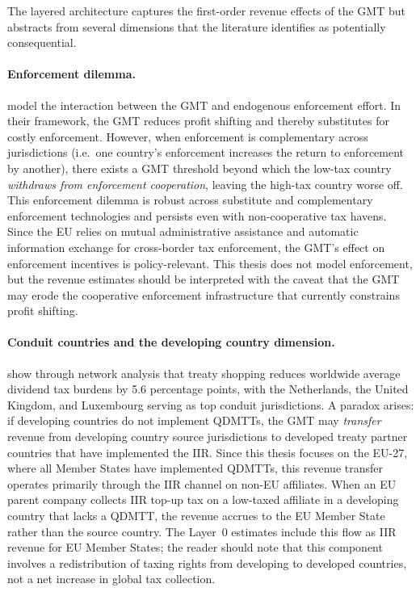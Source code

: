 \documentclass[11pt,a4paper]{article}
\begin{document}
The layered architecture captures the first-order revenue effects of the GMT but abstracts from several dimensions that the literature identifies as potentially consequential.

\paragraph{Enforcement dilemma.} \citet{hindriks2025} model the interaction between the GMT and endogenous enforcement effort. In their framework, the GMT reduces profit shifting and thereby substitutes for costly enforcement. However, when enforcement is complementary across jurisdictions (i.e.\ one country's enforcement increases the return to enforcement by another), there exists a GMT threshold beyond which the low-tax country \emph{withdraws from enforcement cooperation}, leaving the high-tax country worse off. This enforcement dilemma is robust across substitute and complementary enforcement technologies and persists even with non-cooperative tax havens. Since the EU relies on mutual administrative assistance and automatic information exchange for cross-border tax enforcement, the GMT's effect on enforcement incentives is policy-relevant. This thesis does not model enforcement, but the revenue estimates should be interpreted with the caveat that the GMT may erode the cooperative enforcement infrastructure that currently constrains profit shifting.

\paragraph{Conduit countries and the developing country dimension.} \citet{vantriet2025} show through network analysis that treaty shopping reduces worldwide average dividend tax burdens by 5.6 percentage points, with the Netherlands, the United Kingdom, and Luxembourg serving as top conduit jurisdictions. A paradox arises: if developing countries do not implement QDMTTs, the GMT may \emph{transfer} revenue from developing country source jurisdictions to developed treaty partner countries that have implemented the IIR. Since this thesis focuses on the EU-27, where all Member States have implemented QDMTTs, this revenue transfer operates primarily through the IIR channel on non-EU affiliates. When an EU parent company collects IIR top-up tax on a low-taxed affiliate in a developing country that lacks a QDMTT, the revenue accrues to the EU Member State rather than the source country. The Layer~0 estimates include this flow as IIR revenue for EU Member States; the reader should note that this component involves a redistribution of taxing rights from developing to developed countries, not a net increase in global tax collection.
\end{document}
